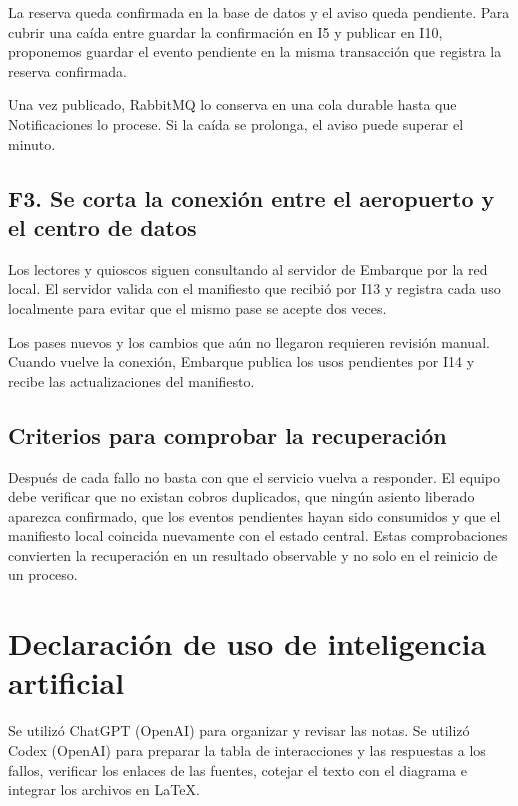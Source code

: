 \documentclass[11pt,a4paper]{article}
\begin{document}
La reserva queda confirmada en la base de datos y el aviso queda pendiente. Para cubrir una caída entre guardar la confirmación en I5 y publicar en I10, proponemos guardar el evento pendiente en la misma transacción que registra la reserva confirmada.

Una vez publicado, RabbitMQ lo conserva en una cola durable hasta que Notificaciones lo procese. Si la caída se prolonga, el aviso puede superar el minuto.

\subsection*{F3. Se corta la conexión entre el aeropuerto y el centro de datos}

Los lectores y quioscos siguen consultando al servidor de Embarque por la red local. El servidor valida con el manifiesto que recibió por I13 y registra cada uso localmente para evitar que el mismo pase se acepte dos veces.

Los pases nuevos y los cambios que aún no llegaron requieren revisión manual. Cuando vuelve la conexión, Embarque publica los usos pendientes por I14 y recibe las actualizaciones del manifiesto.

\subsection*{Criterios para comprobar la recuperación}

Después de cada fallo no basta con que el servicio vuelva a responder. El equipo debe verificar que no existan cobros duplicados, que ningún asiento liberado aparezca confirmado, que los eventos pendientes hayan sido consumidos y que el manifiesto local coincida nuevamente con el estado central. Estas comprobaciones convierten la recuperación en un resultado observable y no solo en el reinicio de un proceso.

\section*{Declaración de uso de inteligencia artificial}

Se utilizó ChatGPT (OpenAI) para organizar y revisar las notas. Se utilizó Codex (OpenAI) para preparar la tabla de interacciones y las respuestas a los fallos, verificar los enlaces de las fuentes, cotejar el texto con el diagrama e integrar los archivos en LaTeX.

{\small\printbibliography[title={Referencias}]}
\end{document}
